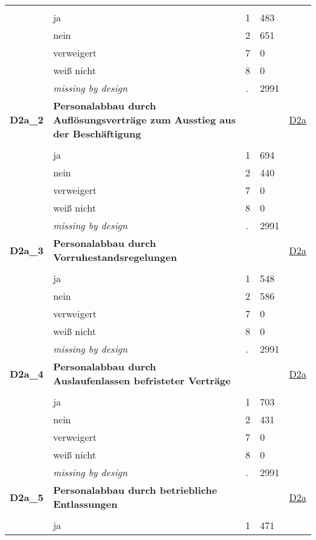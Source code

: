 \begin{longtable}{| L{2.65cm} | L{8cm} | C{1.5cm} | R{1.25cm} | C{2.25cm}  |}
   &  &  &  &  \\ 
   & ja & 1 & 483 &  \\ 
   & nein & 2 & 651 &  \\ 
   & verweigert & 7 & 0 &  \\ 
   & weiß nicht & 8 & 0 &  \\ 
   & \textit{missing by design} & \textit{.} & 2991 &  \\ 
   \midrule
\textbf{D2a\_2}\label{var:D2a:2} & \textbf{Personalabbau durch Auflösungsverträge zum Ausstieg aus der Beschäftigung} &  &  & \hyperref[D2a]{D2a} \\ 
   &  &  &  &  \\ 
   & ja & 1 & 694 &  \\ 
   & nein & 2 & 440 &  \\ 
   & verweigert & 7 & 0 &  \\ 
   & weiß nicht & 8 & 0 &  \\ 
   & \textit{missing by design} & \textit{.} & 2991 &  \\ 
   \midrule
\textbf{D2a\_3}\label{var:D2a:3} & \textbf{Personalabbau durch Vorruhestandsregelungen} &  &  & \hyperref[D2a]{D2a} \\ 
   &  &  &  &  \\ 
   & ja & 1 & 548 &  \\ 
   & nein & 2 & 586 &  \\ 
   & verweigert & 7 & 0 &  \\ 
   & weiß nicht & 8 & 0 &  \\ 
   & \textit{missing by design} & \textit{.} & 2991 &  \\ 
   \midrule
\textbf{D2a\_4}\label{var:D2a:4} & \textbf{Personalabbau durch Auslaufenlassen befristeter Verträge} &  &  & \hyperref[D2a]{D2a} \\ 
   &  &  &  &  \\ 
   & ja & 1 & 703 &  \\ 
   & nein & 2 & 431 &  \\ 
   & verweigert & 7 & 0 &  \\ 
   & weiß nicht & 8 & 0 &  \\ 
   & \textit{missing by design} & \textit{.} & 2991 &  \\ 
   \midrule
\textbf{D2a\_5}\label{var:D2a:5} & \textbf{Personalabbau durch betriebliche Entlassungen} &  &  & \hyperref[D2a]{D2a} \\ 
   &  &  &  &  \\ 
   & ja & 1 & 471 &  \\ 

\end{longtable}
